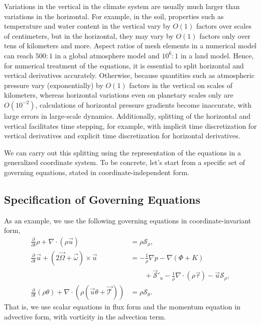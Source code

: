 \documentclass{report}
\begin{document}
Variations in the vertical in the climate system are usually much larger than variations in the horizontal. For example, in the soil, properties such as temperature and water content  in the vertical vary by $O(1)$ factors over scales of centimeters, but in the horizontal, they may vary by $O(1)$ factors only over tens of kilometers and more. Aspect ratios of mesh elements in a numerical model can reach $500:1$ in a global atmosphere model and $10^6:1$ in a land model. Hence, for numerical treatment of the equations, it is essential to split horizontal and vertical derivatives accurately. Otherwise, because quantities such as atmospheric pressure vary (exponentially) by $O(1)$ factors in the vertical on scales of kilometers, whereas horizontal variations even on planetary scales only are $O(10^{-2})$, calculations of horizontal pressure gradients become inaccurate, with large errors in large-scale dynamics. Additionally, splitting of the horizontal and vertical facilitates time stepping, for example, with implicit time discretization for vertical derivatives and explicit time discretization for horizontal derivatives. 

We can carry out this splitting using the representation of the equations in a generalized coordinate system. To be concrete, let's start from a specific set of governing equations, stated in coordinate-independent form. 

\subsection{Specification of Governing Equations}

As an example, we use the following governing equations in coordinate-invariant form,
\begin{subequations}\label{e:EOM_ex}
\begin{align}
     \frac{\partial}{\partial t} \rho + \nabla \cdot \left( \rho \vec{u} \right)
    & = \rho \mathcal{S}_\rho,  \\
    \frac{\partial}{\partial t} \vec{u} + (2\vec{\Omega} + \vec{\omega}) \times \vec{u}
    & = -\frac{1}{\rho} \nabla p - \nabla(\Phi + K) \nonumber \\
    & \qquad + \vec{\mathcal{S}}'_u - \frac{1}{\rho} \nabla \cdot \left(\rho \vec{\tau} \right) 
    - \vec{u} \mathcal{S}_\rho, \\
    \frac{\partial}{\partial t} (\rho \theta) + \nabla \cdot \left(\rho (\vec{u}\theta + \vec{\mathcal{T}}) \right)
    & = \rho \mathcal{S}_\theta.
\end{align}
\end{subequations}
That is, we use scalar equations in flux form and the momentum equation in advective form, with vorticity in the advection term.
\end{document}
